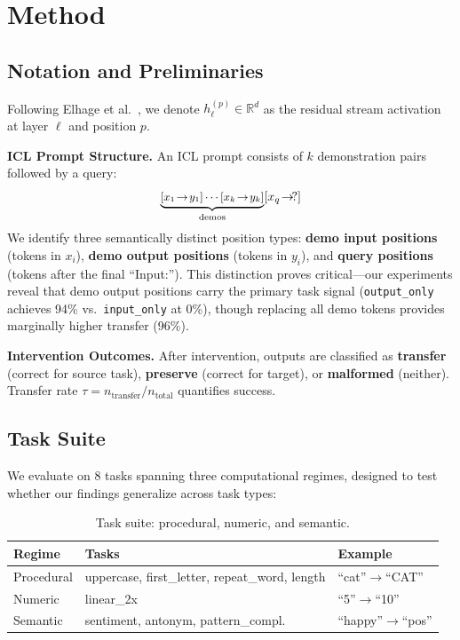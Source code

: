 \documentclass[sigconf,anonymous]{acmart}
\begin{document}
\section{Method}
\label{sec:method}

\subsection{Notation and Preliminaries}

Following Elhage et al.~\cite{elhage2021mathematical}, we denote $h_\ell^{(p)} \in \mathbb{R}^d$ as the residual stream activation at layer $\ell$ and position $p$.

\textbf{ICL Prompt Structure.} An ICL prompt consists of $k$ demonstration pairs followed by a query:
\begin{equation}
\small
    \underbrace{[x_1 \!\to\! y_1] \cdots [x_k \!\to\! y_k]}_{\text{demos}} [x_q \!\to\! ?]
\end{equation}
We identify three semantically distinct position types: \textbf{demo input positions} (tokens in $x_i$), \textbf{demo output positions} (tokens in $y_i$), and \textbf{query positions} (tokens after the final ``Input:''). This distinction proves critical---our experiments reveal that demo output positions carry the primary task signal (\texttt{output\_only} achieves 94\% vs.\ \texttt{input\_only} at 0\%), though replacing all demo tokens provides marginally higher transfer (96\%).

\textbf{Intervention Outcomes.} After intervention, outputs are classified as \textbf{transfer} (correct for source task), \textbf{preserve} (correct for target), or \textbf{malformed} (neither). Transfer rate $\tau = n_{\text{transfer}} / n_{\text{total}}$ quantifies success.

\subsection{Task Suite}

We evaluate on 8 tasks spanning three computational regimes, designed to test whether our findings generalize across task types:

\begin{table}[t]
\centering
\small
\caption{Task suite: procedural, numeric, and semantic.}
\label{tab:tasks}
\begin{tabular}{@{}lp{2.8cm}l@{}}
\toprule
\textbf{Regime} & \textbf{Tasks} & \textbf{Example} \\
\midrule
Procedural & uppercase, first\_letter, repeat\_word, length & ``cat''$\to$``CAT'' \\
Numeric & linear\_2x & ``5''$\to$``10'' \\
Semantic & sentiment, antonym, pattern\_compl. & ``happy''$\to$``pos'' \\
\bottomrule
\end{tabular}
\end{table}
\end{document}

